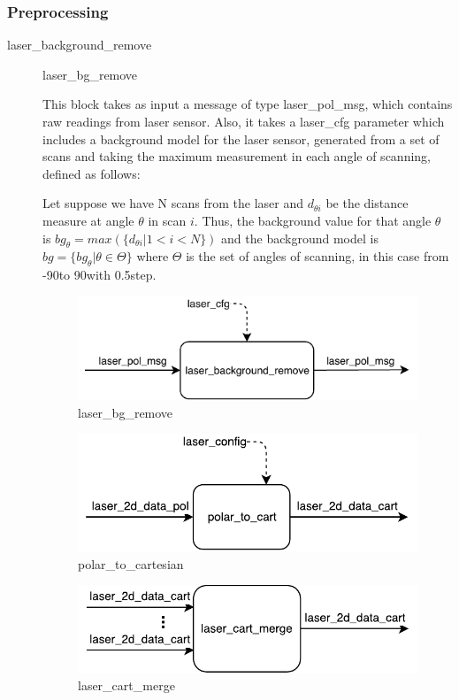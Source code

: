 \subsubsection{Preprocessing}
\begin{description}
\item[laser\_background\_remove]laser\_bg\_remove

This block takes as input a message of type laser\_pol\_msg, which contains raw readings from laser sensor. Also, it takes a laser\_cfg parameter which includes a background model for the laser sensor, generated from a set of scans and taking the maximum measurement in each angle of scanning, defined as follows:

Let suppose we have N scans from the laser and $d_{\theta i}$ be the distance measure at angle $\theta$ in scan $i$. Thus, the background value for that angle $\theta$ is $bg_\theta = max( \{d_{\theta i} | 1 < i < N\})$ and the background model is $bg = \{bg_\theta | \theta \in \Theta\} $ where $\Theta$ is the set of angles of scanning, in this case from -90\degree to 90\degree with 0.5\degree step.
\begin{figure}[ht!]
\centering
\includegraphics[scale=0.7]{fig/3/laser_bg_remove.pdf}
\caption{laser\_bg\_remove}
\label{laser_bg_remove}
\end{figure}

\begin{figure}[ht!]
\centering
\includegraphics[scale=0.7]{fig/3/polar2cart.pdf}
\caption{polar\_to\_cartesian}
\label{polar_to_cartesian}
\end{figure}

\begin{figure}[ht!]
\centering
\includegraphics[scale=0.7]{fig/3/laser_cart_merge.pdf}
\caption{laser\_cart\_merge}
\label{laser_cart_merge}
\end{figure}


\end{description}
